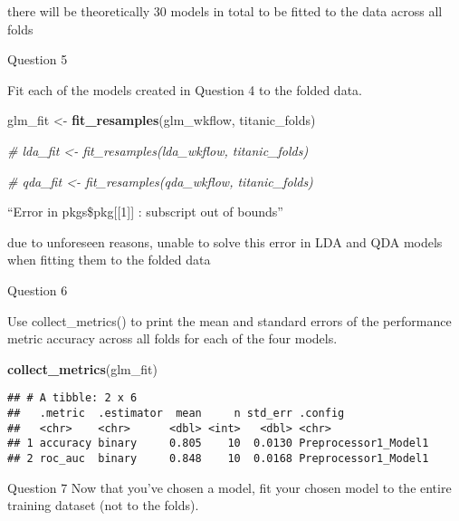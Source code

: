 \documentclass[]{article}
\newenvironment{Shaded}{\begin{snugshade}}{\end{snugshade}}
\newcommand{\CommentTok}[1]{\textcolor[rgb]{0.56,0.35,0.01}{\textit{#1}}}
\newcommand{\KeywordTok}[1]{\textcolor[rgb]{0.13,0.29,0.53}{\textbf{#1}}}
\newcommand{\NormalTok}[1]{#1}
\newcommand{\StringTok}[1]{\textcolor[rgb]{0.31,0.60,0.02}{#1}}
\begin{document}
there will be theoretically 30 models in total to be fitted to the data
across all folds

Question 5

Fit each of the models created in Question 4 to the folded data.

\begin{Shaded}
\begin{Highlighting}[]
\NormalTok{glm_fit <-}\StringTok{ }\KeywordTok{fit_resamples}\NormalTok{(glm_wkflow, titanic_folds)}
\end{Highlighting}
\end{Shaded}

\begin{Shaded}
\begin{Highlighting}[]
\CommentTok{# lda_fit <- fit_resamples(lda_wkflow, titanic_folds)}
\end{Highlighting}
\end{Shaded}

\begin{Shaded}
\begin{Highlighting}[]
\CommentTok{# qda_fit <- fit_resamples(qda_wkflow, titanic_folds)}
\end{Highlighting}
\end{Shaded}

``Error in pkgs\$pkg{[}{[}1{]}{]} : subscript out of bounds''

due to unforeseen reasons, unable to solve this error in LDA and QDA
models when fitting them to the folded data

Question 6

Use collect\_metrics() to print the mean and standard errors of the
performance metric accuracy across all folds for each of the four
models.

\begin{Shaded}
\begin{Highlighting}[]
\KeywordTok{collect_metrics}\NormalTok{(glm_fit)}
\end{Highlighting}
\end{Shaded}

\begin{verbatim}
## # A tibble: 2 x 6
##   .metric  .estimator  mean     n std_err .config             
##   <chr>    <chr>      <dbl> <int>   <dbl> <chr>               
## 1 accuracy binary     0.805    10  0.0130 Preprocessor1_Model1
## 2 roc_auc  binary     0.848    10  0.0168 Preprocessor1_Model1
\end{verbatim}

Question 7 Now that you've chosen a model, fit your chosen model to the
entire training dataset (not to the folds).
\end{document}
